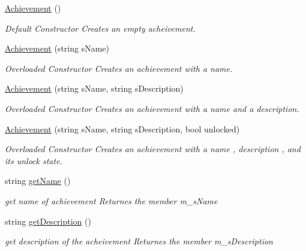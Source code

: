 \begin{DoxyCompactItemize}
\item 
\hypertarget{class_achievement_acea9a90b8128628e1bddc45a83afaa99}{}\label{class_achievement_acea9a90b8128628e1bddc45a83afaa99} 
\hyperlink{class_achievement_acea9a90b8128628e1bddc45a83afaa99}{Achievement} ()
\begin{DoxyCompactList}\small\item\em Default Constructor Creates an empty acheivement. \end{DoxyCompactList}\item 
\hyperlink{class_achievement_ad36246aeeae27b2e82a3a6d259cd483d}{Achievement} (string s\+Name)
\begin{DoxyCompactList}\small\item\em Overloaded Constructor Creates an achievement with a name. \end{DoxyCompactList}\item 
\hyperlink{class_achievement_ac3d729e601b49f195f671e93422159f5}{Achievement} (string s\+Name, string s\+Description)
\begin{DoxyCompactList}\small\item\em Overloaded Constructor Creates an achievement with a name and a description. \end{DoxyCompactList}\item 
\hyperlink{class_achievement_a83be456772eb1bb65ba8414111b34040}{Achievement} (string s\+Name, string s\+Description, bool unlocked)
\begin{DoxyCompactList}\small\item\em Overloaded Constructor Creates an achievement with a name , description , and its unlock state. \end{DoxyCompactList}\item 
\hypertarget{class_achievement_a83cf7bc45be0c270636f230cf6e6334d}{}\label{class_achievement_a83cf7bc45be0c270636f230cf6e6334d} 
string \hyperlink{class_achievement_a83cf7bc45be0c270636f230cf6e6334d}{get\+Name} ()
\begin{DoxyCompactList}\small\item\em get name of achievement Returnes the member m\+\_\+s\+Name \end{DoxyCompactList}\item 
\hypertarget{class_achievement_a68f758c3db2d4873ad5452fcea1a84b3}{}\label{class_achievement_a68f758c3db2d4873ad5452fcea1a84b3} 
string \hyperlink{class_achievement_a68f758c3db2d4873ad5452fcea1a84b3}{get\+Description} ()
\begin{DoxyCompactList}\small\item\em get description of the acheivement Returnes the member m\+\_\+s\+Description \end{DoxyCompactList}\item 

\end{DoxyCompactItemize}
